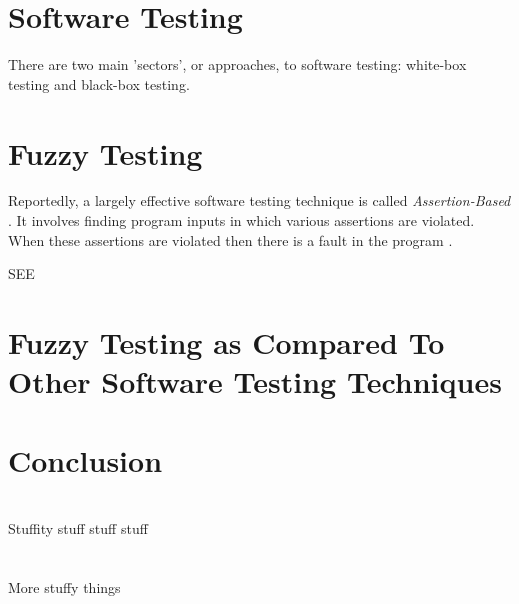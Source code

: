 \documentclass[10pt, final, journal, letterpaper, twoside, twocolumn]{IEEEtran}
\begin{document}
\section{Software Testing}
	There are two main 'sectors', or approaches, to software testing: white-box testing and black-box testing.


\section{Fuzzy Testing}
	Reportedly, a largely effective software testing technique is called \textit{Assertion-Based} \cite{assertion}. It involves finding program inputs in which various assertions are violated. When these assertions are violated then there is a fault in the program \cite{assertion}.
	
	
	SEE \cite{break-software}
	
	
		
	

\section{Fuzzy Testing as Compared To Other Software Testing Techniques}
	


\section{Conclusion}

\pagebreak
	
\appendices
	\section{}
		Stuffity stuff stuff stuff
	\section{}
		More stuffy things
	
\newpage
\nocite{*}


\end{document}
